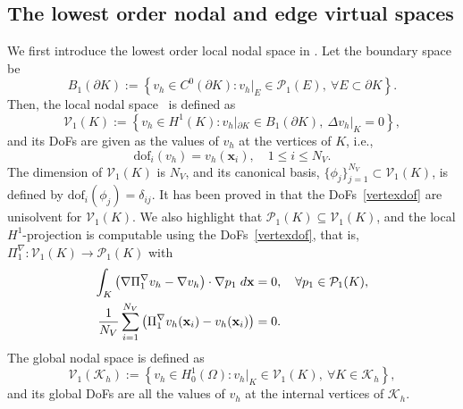 \documentclass[a4paper]{article}
\theoremstyle{plain}
\theoremstyle{definition}
\numberwithin{equation}{section}
\begin{document}

\subsection{The lowest order nodal and edge virtual spaces}
We first introduce the lowest order local nodal space in \cite{BEI13,BEI14}.
Let the boundary space be
\begin{equation*}
B_1(\partial K):=\left\{ v_h\in C^0(\partial K):v_h|_E\in \mathcal{P}_1(E),\ \forall E\subset \partial K\right\}.
\end{equation*}
Then, the local nodal space~\cite{BEI13,BEI14} is defined as
\begin{equation*}
\mathcal{V}_1(K):=\left\{ v_h\in H^1(K): v_h|_{\partial K}\in B_1(\partial K),\ \Delta v_h|_K=0\right\},
\end{equation*}
and its DoFs are given as the values of $v_h$ at the vertices of $K$, i.e.,
\begin{equation}\label{vertexdof}
\text{dof}_i(v_h)=v_h(\mathbf{x}_i), \quad 1\leq i\leq N_V. 
\end{equation}
The dimension of $\mathcal V_1(K)$ is $N_V$, and
its canonical basis, $\{\phi_j\}_{j=1}^{N_V}\subset \mathcal V_1(K)$, is defined by $\text{dof}_i(\phi_j)=\delta_{ij}$.
It has been proved in \cite{BEI13} that the DoFs~\eqref{vertexdof} are unisolvent for $\mathcal V_1(K)$.
We also highlight that $\mathcal{P}_1(K)\subseteq \mathcal V_1(K)$, and the local $H^1$-projection is computable using the DoFs~\eqref{vertexdof}, that is, $\Pi^\nabla_{1}:\mathcal V_1(K)\rightarrow\mathcal{P}_1(K)$ with
\begin{align*}
\int_K\left(\nabla \Pi_{1}^\nabla v_h-\nabla v_h\right)\cdot \nabla p_1\;{\rm d}\mathbf{x}&=0,\quad\forall p_1\in\mathcal{P}_1(K),\\
\frac{1}{N_V}\sum_{i=1}^{N_V}\left(\Pi_{1}^\nabla v_h(\mathbf{x}_i)-v_h(\mathbf{x}_i)\right)&=0.
\end{align*}
The global nodal space is defined as
\begin{equation*}
\mathcal V_1(\mathcal{K}_h):=\left\{v_h\in H_0^1(\Omega):\left.v_h\right|_K\in \mathcal V_1(K),\ \forall K\in \mathcal{K}_h\right\},
\end{equation*}
and its global DoFs are all the values of $v_h$ at the internal vertices of $\mathcal{K}_h$.
\end{document}

